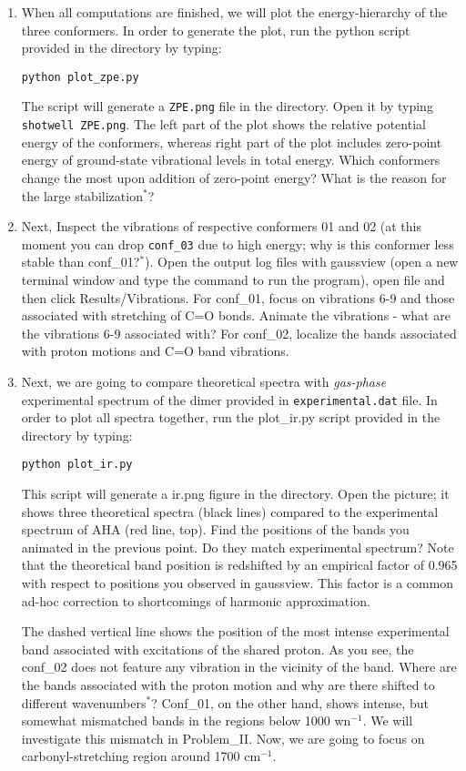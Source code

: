 \documentclass{tufte-handout}
\begin{document}
\begin{enumerate}
	\item When all computations are finished, we will plot the energy-hierarchy of the three conformers. In order to generate the plot, run the python script provided in the directory by typing:
	
	{\tt python plot\_zpe.py} 
	
	The script will generate a {\tt ZPE.png} file in the directory. Open it by typing {\tt shotwell ZPE.png}. The left part of the plot shows the relative potential energy of the conformers, whereas right part of the plot includes zero-point energy of ground-state vibrational levels in total energy. Which conformers change the most upon addition of zero-point energy? What is the reason for the large stabilization$^*$? 
	
	\item Next, Inspect the vibrations of respective conformers 01 and 02 (at this moment you can drop {\tt conf\_03} due to high energy; why is this conformer less stable than conf\_01?$^*$). Open the output log files with gaussview (open a new terminal window and type the command to run the program), open file and then click Results/Vibrations.  For conf\_01, focus on vibrations 6-9 and those associated with stretching of C=O bonds. Animate the vibrations - what are the vibrations 6-9 associated with? For conf\_02, localize the bands associated with proton motions and C=O band vibrations. 
	
	\item Next, we are going to compare theoretical spectra with {\it gas-phase} experimental spectrum of the dimer provided in {\tt experimental.dat} file. In order to plot all spectra together, run the plot\_ir.py script provided in the directory by typing:
	
	{\tt python plot\_ir.py}
	
	This script will generate a ir.png figure in the directory. Open the picture; it shows three theoretical spectra (black lines) compared to the experimental spectrum of AHA (red line, top). Find the positions of the bands you animated in the previous point. Do they match experimental spectrum? Note that the theoretical band position is redshifted by an empirical factor of 0.965 with respect to positions you observed in gaussview. This factor is a common ad-hoc correction to shortcomings of harmonic approximation. 
	
	The dashed vertical line shows the position of the most intense experimental band associated with excitations of the shared proton. As you see, the conf\_02 does not feature any vibration in the vicinity of the band. Where are the bands associated with the proton motion and why are there shifted to different wavenumbers$^*$? Conf\_01,  on the other hand, shows intense, but somewhat mismatched bands in the regions below 1000 wn$^{-1}$. We will investigate this mismatch in Problem\_II. Now, we are going to focus on carbonyl-stretching region around 1700 cm$^{-1}$. 
	

\end{enumerate}
\end{document}
